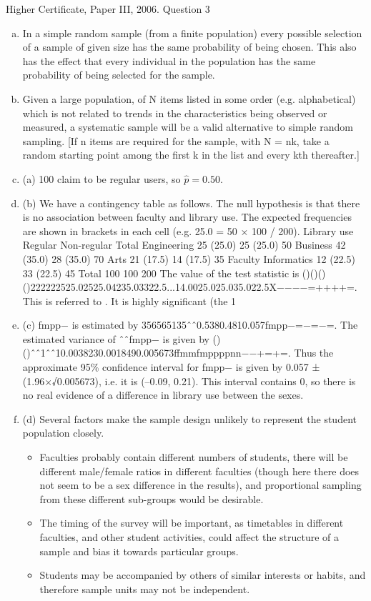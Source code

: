 \documentclass[a4paper,12pt]{article}
\begin{document}
Higher Certificate, Paper III, 2006. Question 3
\begin{enumerate}[(a)]
\item In a simple random sample (from a finite population) every possible selection of a sample of given size has the same probability of being chosen. This also has the effect that every individual in the population has the same probability of being selected for the sample.
\item Given a large population, of N items listed in some order (e.g. alphabetical) which is not related to trends in the characteristics being observed or measured, a systematic sample will be a valid alternative to simple random sampling. [If n items are required for the sample, with N = nk, take a random starting point among the first k in the list and every kth thereafter.]
\item(a) 100 claim to be regular users, so  $\hat{p}= 0.50$.
\item (b) We have a contingency table as follows. The null hypothesis is that there is no association between faculty and library use. The expected frequencies are shown in brackets in each cell (e.g. 25.0 = 50 × 100 / 200).
Library use
Regular
Non-regular
Total
Engineering
25 (25.0)
25 (25.0)
50
Business
42 (35.0)
28 (35.0)
70
Arts
21 (17.5)
14 (17.5)
35
Faculty
Informatics
12 (22.5)
33 (22.5)
45
Total
100
100
200
The value of the test statistic is
()()()()222222525.02525.04235.03322.5...14.0025.025.035.022.5X−−−−=++++=.
This is referred to . It is highly significant (the 1%


\item(c) fmpp− is estimated by 356565135ˆˆ0.5380.4810.057fmpp−=−=−=. The estimated variance of ˆˆfmpp− is given by
()()ˆˆ1ˆˆ10.0038230.0018490.005673ffmmfmppppnn−−+=+=.
Thus the approximate 95\% confidence interval for fmpp− is given by 0.057 ± (1.96×√0.005673), i.e. it is (–0.09, 0.21).
This interval contains 0, so there is no real evidence of a difference in library use between the sexes.
\item (d) Several factors make the sample design unlikely to represent the student population closely. 

\begin{itemize}
    \item Faculties probably contain different numbers of students, there will be different male/female ratios in different faculties (though here there does not seem to be a sex difference in the results), and proportional sampling from these different sub-groups would be desirable.
    \item The timing of the survey will be important, as timetables in different faculties, and other student activities, could affect the structure of a sample and bias it towards particular groups.
    \item Students may be accompanied by others of similar interests or habits, and therefore sample units may not be independent.
\end{itemize}


 \end{enumerate}
 
\end{document}
